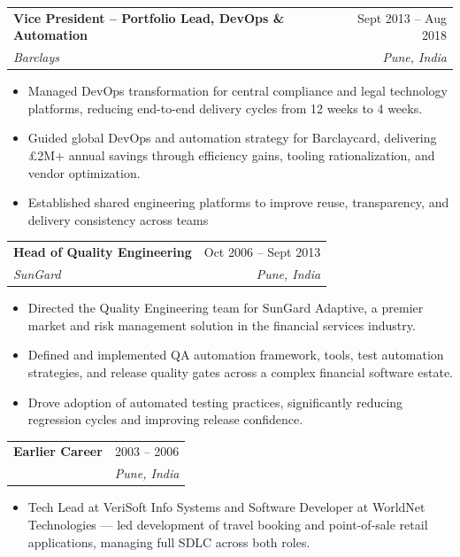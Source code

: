 \documentclass[letterpaper,11pt]{article}
\makeatletter
\newcommand{\resumeItem}[1]{
  \item\small{
    {#1 \vspace{-2pt}}
  }
}
\newcommand{\resumeSubheading}[4]{
  \vspace{-2pt}\item
    \begin{tabular*}{0.97\textwidth}[t]{l@{\extracolsep{\fill}}r}
      \textbf{#1} & #2 \\
      \textit{\small#3} & \textit{\small #4} \\
    \end{tabular*}\vspace{-7pt}
}
\newcommand{\resumeItemListStart}{\begin{itemize}}
\newcommand{\resumeItemListEnd}{\end{itemize}\vspace{-5pt}}
\makeatother
\begin{document}
    \resumeSubheading
      {Vice President – Portfolio Lead, DevOps \& Automation}{Sept 2013 -- Aug 2018}
      {Barclays}{Pune, India}
      \resumeItemListStart
        \resumeItem{Managed DevOps transformation for central compliance and legal technology platforms, reducing end-to-end delivery cycles from 12 weeks to 4 weeks.}
        \resumeItem{Guided global DevOps and automation strategy for Barclaycard, delivering £2M+ annual savings through efficiency gains, tooling rationalization, and vendor optimization.}
        \resumeItem{Established shared engineering platforms to improve reuse, transparency, and delivery consistency across teams}
    \resumeItemListEnd

    \resumeSubheading
      {Head of Quality Engineering}{Oct 2006 -- Sept 2013}
      {SunGard}{Pune, India}
      \resumeItemListStart
        \resumeItem{Directed the Quality Engineering team for SunGard Adaptive, a premier market and risk management solution in the financial services industry.}
        \resumeItem{Defined and implemented QA automation framework, tools, test automation strategies, and release quality gates across a complex financial software estate.}
        \resumeItem{Drove adoption of automated testing practices, significantly reducing regression cycles and improving release confidence.}
    \resumeItemListEnd

    \resumeSubheading
      {Earlier Career}{2003 -- 2006}
      {}{Pune, India}
      \resumeItemListStart
        \resumeItem{Tech Lead at VeriSoft Info Systems and Software Developer at WorldNet Technologies — led development of travel booking and point-of-sale retail applications, managing full SDLC across both roles.}
    \resumeItemListEnd

\end{document}
